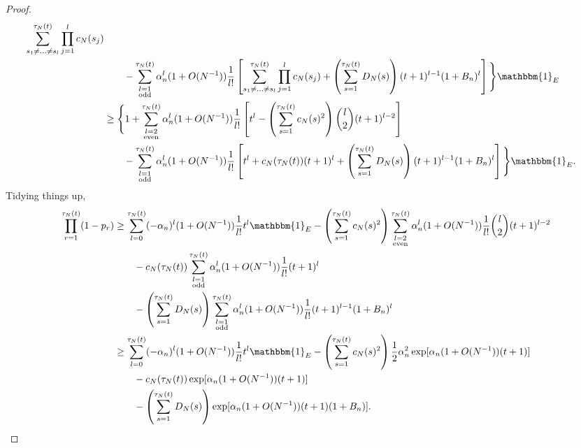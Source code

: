 \documentclass{article}
\newcommand{\1}[1]{\mathbbm{1}_{#1}}
\begin{document}
\begin{proof}
\begin{align}
        \sum_{s_1\neq\dots\neq s_l}^{\tau_N(t)}\prod_{j=1}^l c_N(s_j) \notag\\
    &\qquad- \sum_{\substack{l=1 \\ \text{odd} }}^{\tau_N(t)} 
        \alpha_n^l (1+O(N^{-1})) \frac{1}{l!}
        \left[ \sum_{s_1\neq\dots\neq s_l}^{\tau_N(t)}\prod_{j=1}^l c_N(s_j)
        + \left( \sum_{s=1}^{\tau_N(t)} D_N(s) \right)
        (t+1)^{l-1} (1+B_n)^l \right] \Bigg\} \1{E} \notag\\
&\geq \Bigg\{ 1 + \sum_{\substack{l=2 \\ \text{even} }}^{\tau_N(t)} 
        \alpha_n^l (1+O(N^{-1})) \frac{1}{l!} 
        \left[ t^l - \left( \sum_{s=1}^{\tau_N(t)} c_N(s)^2 \right)
        \binom{l}{2}(t+1)^{l-2} \right] \notag\\
    &\qquad- \sum_{\substack{l=1 \\ \text{odd} }}^{\tau_N(t)} 
        \alpha_n^l (1+O(N^{-1})) \frac{1}{l!}
        \left[ t^l + c_N(\tau_N(t)) (t+1)^l
        + \left( \sum_{s=1}^{\tau_N(t)} D_N(s) \right)
        (t+1)^{l-1} (1+B_n)^l \right] \Bigg\} \1{E} .
\end{align}
Tidying things up,
\begin{align}
\prod_{r=1}^{\tau_N(t)} (1-p_r)
&\geq \sum_{l=0}^{\tau_N(t)} (-\alpha_n)^l (1+O(N^{-1})) 
        \frac{1}{l!} t^l \1{E}
        - \left( \sum_{s=1}^{\tau_N(t)} c_N(s)^2 \right)
        \sum_{\substack{l=2 \\ \text{even} }}^{\tau_N(t)} 
        \alpha_n^l (1+O(N^{-1})) \frac{1}{l!} \binom{l}{2}(t+1)^{l-2} \notag\\
    &\qquad- c_N(\tau_N(t)) \sum_{\substack{l=1 \\ \text{odd} }}^{\tau_N(t)} 
        \alpha_n^l (1+O(N^{-1})) \frac{1}{l!} (t+1)^l \notag\\
    &\qquad- \left( \sum_{s=1}^{\tau_N(t)} D_N(s) \right)
        \sum_{\substack{l=1 \\ \text{odd} }}^{\tau_N(t)} 
        \alpha_n^l (1+O(N^{-1})) \frac{1}{l!} (t+1)^{l-1} (1+B_n)^l \notag\\
&\geq \sum_{l=0}^{\tau_N(t)} (-\alpha_n)^l (1+O(N^{-1})) 
        \frac{1}{l!} t^l \1{E}
        - \left( \sum_{s=1}^{\tau_N(t)} c_N(s)^2 \right)
        \frac{1}{2} \alpha_n^2 \exp[ \alpha_n (1+O(N^{-1})) (t+1) ]\notag\\
    &\qquad- c_N(\tau_N(t)) \exp[ \alpha_n (1+O(N^{-1})) (t+1) ] \notag\\
    &\qquad- \left( \sum_{s=1}^{\tau_N(t)} D_N(s) \right)
        \exp[ \alpha_n (1+O(N^{-1})) (t+1) (1+B_n) ]. \label{eq:028}

\end{align}
\end{proof}
\end{document}

